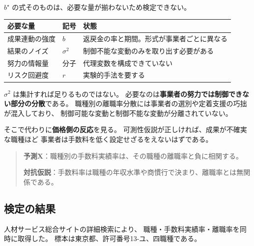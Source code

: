 $b^\star$ の式そのものは、必要な量が揃わないため検定できない。

\begin{center}
\begin{tabularx}{\textwidth}{@{}llX@{}}
\toprule
必要な量 & 記号 & 状態 \\
\midrule
成果連動の強度 & $b$ & 返戻金の率と期間。形式が事業者ごとに異なる \\
結果のノイズ & $\sigma^2$ & 制御不能な変動のみを取り出す必要がある \\
努力の情報量 & 分子 & 代理変数を構成できていない \\
リスク回避度 & $r$ & 実験的手法を要する \\
\bottomrule
\end{tabularx}
\label{tab:bstar-requirements}
\end{center}

$\sigma^2$ は集計すれば足りるものではない。
必要なのは\textbf{事業者の努力では制御できない部分の分散}である。
職種別の離職率分散には事業者の選別や定着支援の巧拙が混入しており、
制御可能な変動と制御不能な変動が分離されていない。

そこで代わりに\textbf{価格側の反応}を見る。
可測性仮説が正しければ、成果が不確実な職種ほど
事業者は手数料を低く設定せざるをえないはずである。

\begin{quote}
\textbf{予測X}：職種別の手数料実績率は、その職種の離職率と負に相関する。

\textbf{対抗仮説}：手数料率は職種の年収水準や商慣行で決まり、離職率とは無関係である。
\end{quote}

\subsection{検定の結果}
\label{sec:predX-result}

人材サービス総合サイトの詳細検索により、
職種・手数料実績率・離職率を同時に取得した。
標本は東京都、許可番号13-ユ、四職種である。

